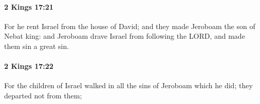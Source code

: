 		\paragraph{2 Kings 17:21} %
			\label{2KINGS-17-21}

			For he rent Israel from the house of David; and they made Jeroboam the son of Nebat king: and Jeroboam drave Israel from following the LORD, and made them sin a great sin.


		\paragraph{2 Kings 17:22} %
			\label{2KINGS-17-22}

			For the children of Israel walked in all the sins of Jeroboam which he did; they departed not from them;


